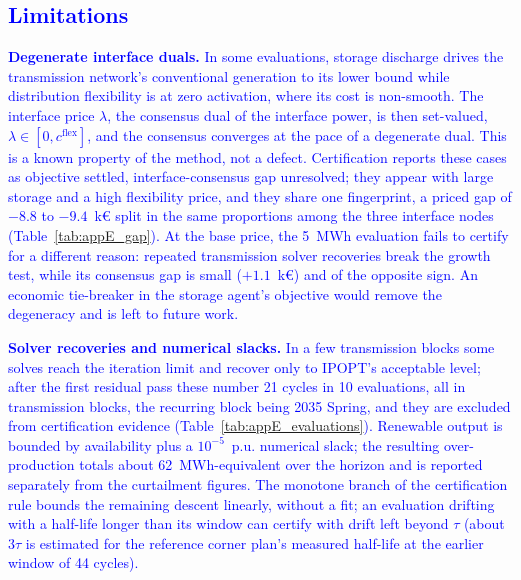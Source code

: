 \documentclass[preprint,12pt]{elsarticle}
\begin{document}
\subsection{\textcolor{blue}{Limitations}}
\label{subsec:res_limitations}

\textcolor{blue}{
    \textbf{Degenerate interface duals.} In some evaluations, storage discharge drives the transmission network's conventional generation to its lower bound while distribution flexibility is at zero activation, where its cost is non-smooth. The interface price $\lambda$, the consensus dual of the interface power, is then set-valued, $\lambda \in [0, c^{\text{flex}}]$, and the consensus converges at the pace of a degenerate dual. This is a known property of the method, not a defect. Certification reports these cases as objective settled, interface-consensus gap unresolved; they appear with large storage and a high flexibility price, and they share one fingerprint, a priced gap of $-8.8$ to $-9.4$~k\euro{} split in the same proportions among the three interface nodes (Table~\ref{tab:appE_gap}). At the base price, the 5~MWh evaluation fails to certify for a different reason: repeated transmission solver recoveries break the growth test, while its consensus gap is small ($+1.1$~k\euro) and of the opposite sign. An economic tie-breaker in the storage agent's objective would remove the degeneracy and is left to future work.
}

\textcolor{blue}{
    \textbf{Solver recoveries and numerical slacks.} In a few transmission blocks some solves reach the iteration limit and recover only to IPOPT's acceptable level; after the first residual pass these number 21 cycles in 10 evaluations, all in transmission blocks, the recurring block being 2035 Spring, and they are excluded from certification evidence (Table~\ref{tab:appE_evaluations}). Renewable output is bounded by availability plus a $10^{-5}$~p.u. numerical slack; the resulting over-production totals about 62~MWh-equivalent over the horizon and is reported separately from the curtailment figures. The monotone branch of the certification rule bounds the remaining descent linearly, without a fit; an evaluation drifting with a half-life longer than its window can certify with drift left beyond $\tau$ (about $3\tau$ is estimated for the reference corner plan's measured half-life at the earlier window of 44 cycles).
}
\end{document}
